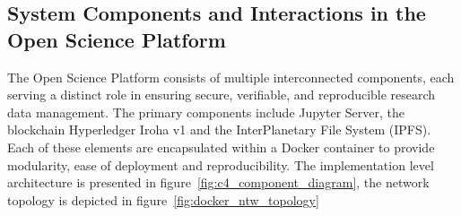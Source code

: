 \documentclass[final]{rc-book-2.14}
\begin{document}
\subsection{System Components and Interactions in the Open Science Platform}

The Open Science Platform consists of multiple interconnected components, each serving a distinct role in ensuring secure, verifiable, and reproducible research data management. The primary components include Jupyter Server, the blockchain Hyperledger Iroha v1 and the InterPlanetary File System (IPFS). Each of these elements are encapsulated within a Docker container to provide modularity, ease of deployment and reproducibility. The implementation level architecture is presented in figure~\ref{fig:c4_component_diagram}, the network topology is depicted in figure~\ref{fig:docker_ntw_topology}
\end{document}
